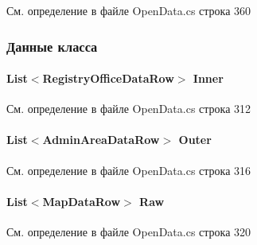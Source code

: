 См. определение в файле Open\+Data.\+cs строка 360



\subsubsection{Данные класса}
\paragraph[{Inner}]{\setlength{\rightskip}{0pt plus 5cm}List$<${\bf Registry\+Office\+Data\+Row}$>$ Inner}\label{classkdz__manager_1_1_open_data_a4a48764400c4991c8b0c82ab12e191e6_a4a48764400c4991c8b0c82ab12e191e6}


См. определение в файле Open\+Data.\+cs строка 312

\paragraph[{Outer}]{\setlength{\rightskip}{0pt plus 5cm}List$<${\bf Admin\+Area\+Data\+Row}$>$ Outer}\label{classkdz__manager_1_1_open_data_af87c250148a042bdc1abafe9273c25ce_af87c250148a042bdc1abafe9273c25ce}


См. определение в файле Open\+Data.\+cs строка 316

\paragraph[{Raw}]{\setlength{\rightskip}{0pt plus 5cm}List$<${\bf Map\+Data\+Row}$>$ Raw}\label{classkdz__manager_1_1_open_data_aaa7963fb899e3dafb354bb287c7156c7_aaa7963fb899e3dafb354bb287c7156c7}


См. определение в файле Open\+Data.\+cs строка 320

